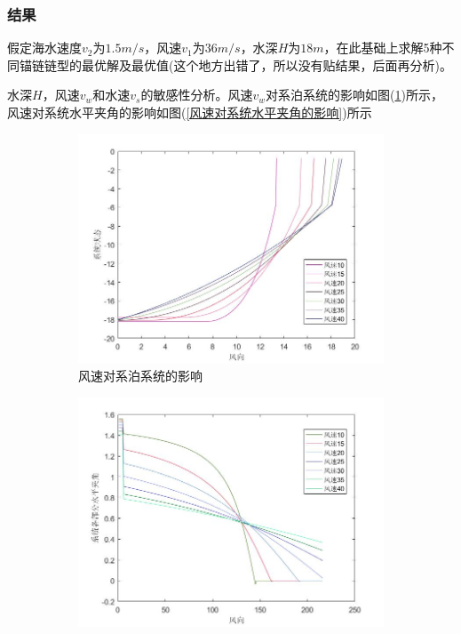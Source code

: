 \documentclass[UTF8]{ctexbook}
\theoremstyle{nonumberplain}
\begin{document}
        \subsubsection{结果}
            \par
            假定海水速度$v_2$为$1.5m/s$，风速$v_1$为$36m/s$，水深$H$为$18m$，在此基础上求解5种不同锚链链型的最优解及最优值(这个地方出错了，所以没有贴结果，后面再分析)。
            \par
            水深$H$，风速$v_w$和水速$v_s$的敏感性分析。风速$v_w$对系泊系统的影响如图(\ref{风速对系泊系统的影响})所示，风速对系统水平夹角的影响如图(\ref{风速对系统水平夹角的影响})所示
            \begin{figure}[H]
                \centering
                \begin{subfigure}[b]{0.4\textwidth}
                    \includegraphics[width=\textwidth]{v_wind_effect_xitong.jpg}
                    \caption{风速对系泊系统的影响}
                    \label{风速对系泊系统的影响}
                \end{subfigure}
                \begin{subfigure}[b]{0.4\textwidth}
                    \includegraphics[width=\textwidth]{images/v_wind_effect_alpha2.jpg}

\end{subfigure}
\end{figure}
\end{document}
